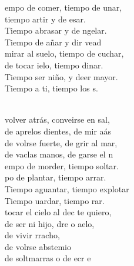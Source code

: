 \begin{cancion}
	\begin{chorus}%
	empo de comer, tiempo de unar,\\
	tiempo artir y de esar.\\
	Tiempo  abrasar y de ngelar.\\
	Tiempo de añar y dir vead\\
\jump
	 mirar al suelo, tiempo de cuchar,\\
	de tocar ielo, tiempo dinar.\\
	Tiempo  ser niño, y deer mayor.\\
	Tiempo a ti, tiempo  los s.\\
	\end{chorus}%
	\jump\\
	 volver atrás, conveirse en sal,\\
	de aprelos dientes, de mir aás\\
	de volrse fuerte, de grir al mar,\\
	de vaclas manos, de garse el n\\
\jump
	empo de morder, tiempo  soltar.\\
	po de plantar, tiempo  arrar.\\
	Tiempo  aguantar, tiempo  explotar\\
	Tiempo uardar, tiempo  rar.\\
\jump
	 tocar el cielo al dec te quiero,\\
	de ser ni hijo, dre o aelo,\\
	de vivir rracho, \\
	de volrse abstemio\\
	de soltmarras o de ecr  e\\\jump\\

\end{cancion}
